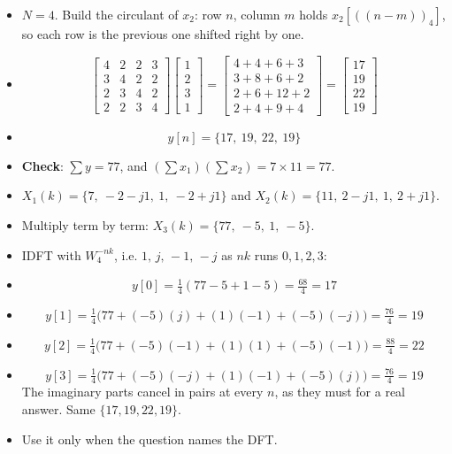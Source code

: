 \begin{itemize}
  \item $N=4$. Build the circulant of $x_2$: row $n$, column $m$ holds
        $x_2[((n-m))_4]$, so each row is the previous one shifted right by one.
  \item[] \[ \begin{bmatrix}4&2&2&3\\3&4&2&2\\2&3&4&2\\2&2&3&4\end{bmatrix}
             \begin{bmatrix}1\\2\\3\\1\end{bmatrix}
             =\begin{bmatrix}4+4+6+3\\3+8+6+2\\2+6+12+2\\2+4+9+4\end{bmatrix}
             =\begin{bmatrix}17\\19\\22\\19\end{bmatrix} \]
  \item[] \[ \boxed{y[n]=\{17,\ 19,\ 22,\ 19\}} \]
  \item \textbf{Check}: $\sum y=77$, and $(\sum x_1)(\sum x_2)=7\times11=77$. \checkmark
\end{itemize}

\begin{itemize}
  \item $X_1(k)=\{7,\ -2-j1,\ 1,\ -2+j1\}$ and $X_2(k)=\{11,\ 2-j1,\ 1,\ 2+j1\}$.
  \item Multiply term by term: $X_3(k)=\{77,\ -5,\ 1,\ -5\}$.
  \item IDFT with $W_4^{-nk}$, i.e. $1,\,j,\,-1,\,-j$ as $nk$ runs $0,1,2,3$:
  \item[] \[ y[0]=\tfrac14(77-5+1-5)=\tfrac{68}{4}=17 \]
  \item[] \[ y[1]=\tfrac14\big(77+(-5)(j)+(1)(-1)+(-5)(-j)\big)=\tfrac{76}{4}=19 \]
  \item[] \[ y[2]=\tfrac14\big(77+(-5)(-1)+(1)(1)+(-5)(-1)\big)=\tfrac{88}{4}=22 \]
  \item[] \[ y[3]=\tfrac14\big(77+(-5)(-j)+(1)(-1)+(-5)(j)\big)=\tfrac{76}{4}=19 \]
        The imaginary parts cancel in pairs at every $n$, as they must for a real
        answer. Same $\{17,19,22,19\}$.
  \item {} Use it only when the question names the DFT.
\end{itemize}

